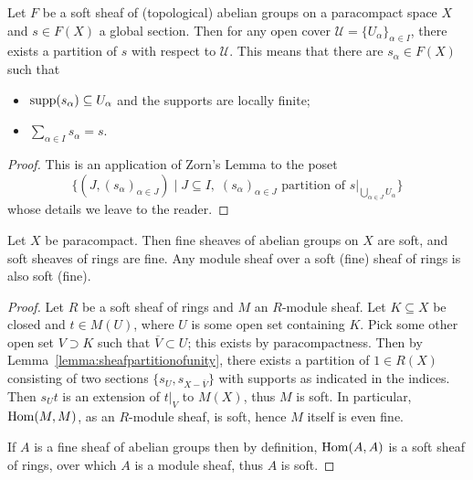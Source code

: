 \documentclass[a4paper,openany]{scrbook}
\begin{document}
\begin{lemma}\label{lemma:sheafpartitionofunity}
Let $F$ be a soft sheaf of (topological) abelian groups on a paracompact space $X$ and $s \in F(X)$ a global section. Then for any open cover $\mathcal U = \{U_\alpha\}_{\alpha \in I}$, there exists a partition of $s$ with respect to $\mathcal U$. This means that there are $s_\alpha \in F(X)$ such that
\begin{itemize}
\item $\operatorname{supp}(s_\alpha) \subseteq U_\alpha$ and the supports are locally finite;
\item $\sum_{\alpha \in I} s_\alpha = s$.
\end{itemize}
\end{lemma}
\begin{proof}
This is an application of Zorn's Lemma to the poset
\[
\{(J,(s_\alpha)_{\alpha \in J}) \mid J \subseteq I,\; (s_\alpha)_{\alpha \in J} \text{ partition of }s|_{\bigcup_{\alpha \in J} U_\alpha}\}
\]
whose details we leave to the reader.
\end{proof}

\begin{prop}\label{prop:finesoftsheaves}
Let $X$ be paracompact. Then fine sheaves of abelian groups on $X$ are soft, and soft sheaves of rings are fine. Any module sheaf over a soft (fine) sheaf of rings is also soft (fine).
\end{prop}
\begin{proof}
Let $R$ be a soft sheaf of rings and $M$ an $R$-module sheaf. Let $K \subseteq X$ be closed and $t \in M(U)$, where $U$ is some open set containing $K$. Pick some other open set $V \supset K$ such that $\overline V \subset U$; this exists by paracompactness. Then by Lemma~\ref{lemma:sheafpartitionofunity}, there exists a partition of $1 \in R(X)$ consisting of two sections $\{s_U,s_{X-\overline V}\}$ with supports as indicated in the indices. Then $s_U t$ is an extension of $t|_V$ to $M(X)$, thus $M$ is soft. In particular, $\operatorname{Hom}(M,M)$, as an $R$-module sheaf, is soft, hence $M$ itself is even fine.

If $A$ is a fine sheaf of abelian groups then by definition, $\operatorname{Hom}(A,A)$ is a soft sheaf of rings, over which $A$ is a module sheaf, thus $A$ is soft.
\end{proof}
\end{document}
